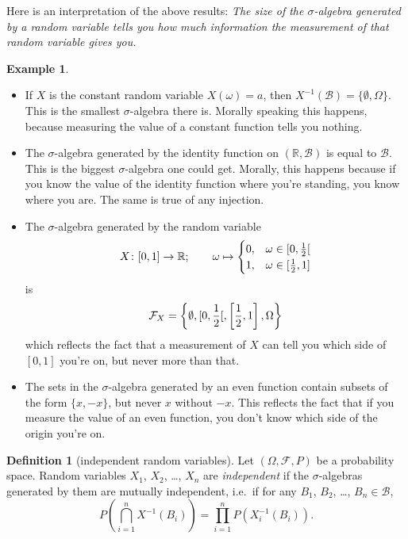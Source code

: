 \documentclass[a4paper]{scrartcl}
\newcommand{\R}{\mathbb{R}}
\theoremstyle{definition}
\newtheorem{definition}{Definition}[section]
\newtheorem{example}{Example}[section]
\theoremstyle{plain}
\theoremstyle{remark}
\begin{document}
Here is an interpretation of the above results: \emph{The size of the $\sigma$-algebra generated by a random variable tells you how much information the measurement of that random variable gives you.}
\begin{example}
  $\,$
  \begin{itemize}
    \item If $X$ is the constant random variable $X(\omega) = a$, then $X^{-1}(\mathcal{B}) = \{\emptyset, \Omega\}$. This is the smallest $\sigma$-algebra there is. Morally speaking this happens, because measuring the value of a constant function tells you nothing.

    \item The $\sigma$-algebra generated by the identity function on $(\R, \mathcal{B})$ is equal to $\mathcal{B}$. This is the biggest $\sigma$-algebra one could get. Morally, this happens because if you know the value of the identity function where you're standing, you know where you are. The same is true of any injection.

    \item The $\sigma$-algebra generated by the random variable
      \begin{equation*}
        X\colon [0, 1] \to \R;\qquad \omega \mapsto
        \begin{cases}
          0, &\omega \in \interval[open right]{0}{\frac{1}{2}} \\
          1, &\omega \in \interval{\frac{1}{2}}{1}
        \end{cases}
      \end{equation*}
      is
      \begin{equation*}
        \mathcal{F}_{X} = \left\{ \emptyset, \interval[open right]{0}{\frac{1}{2}}, \left[ \frac{1}{2}, 1 \right], \Omega \right\}
      \end{equation*}
      which reflects the fact that a measurement of $X$ can tell you which side of $[0, 1]$ you're on, but never more than that.

    \item The sets in the $\sigma$-algebra generated by an even function contain subsets of the form $\{x, -x\}$, but never $x$ without $-x$. This reflects the fact that if you measure the value of an even function, you don't know which side of the origin you're on.
  \end{itemize}
\end{example}

\begin{definition}[independent random variables]
  \label{def:independentrandomvariables}
  Let $(\Omega, \mathcal{F}, P)$ be a probability space. Random variables $X_{1}$, $X_{2}$, \ldots, $X_{n}$ are \emph{independent} if the $\sigma$-algebras generated by them are mutually independent, i.e.\ if for any $B_{1}$, $B_{2}$, \ldots, $B_{n} \in \mathcal{B}$,
  \begin{equation*}
    P\left( \bigcap_{i = 1}^{n} X^{-1}(B_{i}) \right) = \prod_{i = 1}^{n} P(X_{i}^{-1}(B_{i})).
  \end{equation*}
\end{definition}
\end{document}
